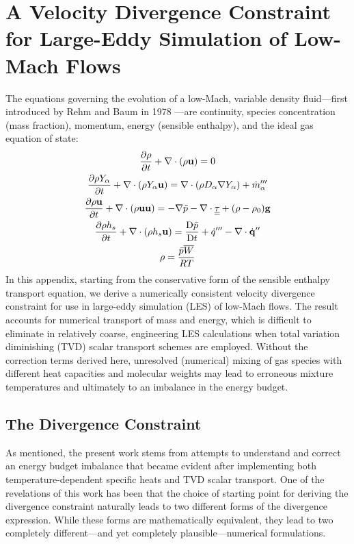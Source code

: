 \chapter{A Velocity Divergence Constraint for Large-Eddy Simulation of Low-Mach Flows}
\label{app_divergence}

The equations governing the evolution of a low-Mach, variable density fluid---first introduced by Rehm and Baum in 1978 \cite{Rehm:1}---are continuity, species concentration (mass fraction), momentum, energy (sensible enthalpy), and the ideal gas equation of state:
\begin{gather}
\label{eqn_rho} \frac{\partial \rho}{\partial t} + \nabla\cdot(\rho\mathbf{u}) = 0 \\
\label{eqn_Y_a} \frac{\partial \rho Y_\alpha}{\partial t} + \nabla\cdot(\rho Y_\alpha \mathbf{u}) = \nabla\cdot (\rho D_\alpha \nabla Y_\alpha) + \dot{m}_\alpha^{\prime\prime\prime} \\
\label{eqn_u}   \frac{\partial \rho \mathbf{u}}{\partial t} + \nabla\cdot(\rho \mathbf{u} \mathbf{u}) = -\nabla \tilde{p} - \nabla\cdot\underline{\underline{\tau}} + (\rho-\rho_0) \mathbf{g} \\
\label{eqn_h_s} \frac{\partial \rho h_s}{\partial t} + \nabla\cdot(\rho h_s \mathbf{u}) = \frac{\mbox{D} \bar{p}}{\mbox{D} t} + \dot{q}^{\prime\prime\prime} - \nabla\cdot \dot{\mathbf{q}}^{\prime\prime} \\
\label{eqn_eos} \rho = \frac{\bar{p} \overline{W}}{RT}
\end{gather}
In this appendix, starting from the conservative form of the sensible enthalpy transport equation, we derive a numerically consistent velocity divergence constraint for use in large-eddy simulation (LES) of low-Mach flows.  The result accounts for numerical transport of mass and energy, which is difficult to eliminate in relatively coarse, engineering LES calculations when total variation diminishing (TVD) scalar transport schemes are employed.  Without the correction terms derived here, unresolved (numerical) mixing of gas species with different heat capacities and molecular weights may lead to erroneous mixture temperatures and ultimately to an imbalance in the energy budget.

\section{The Divergence Constraint}
\label{div_constraint}

As mentioned, the present work stems from attempts to understand and correct an energy budget imbalance that became evident after implementing both temperature-dependent specific heats and TVD scalar transport. One of the revelations of this work has been that the choice of starting point for deriving the divergence constraint naturally leads to two different forms of the divergence expression.  While these forms are mathematically equivalent, they lead to two completely different---and yet completely plausible---numerical formulations.

